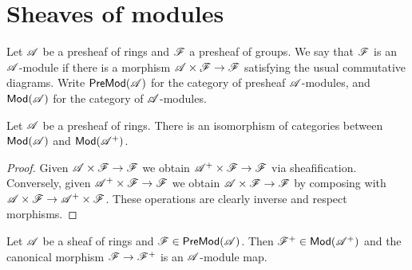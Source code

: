\documentclass{memoir}
\begin{document}
\section{Sheaves of modules}
\begin{definition}
    Let $\mathscr{A}$ be a presheaf of rings and $\mathscr{F}$ a presheaf of groups.
    We say that $\mathscr{F}$ is an $\mathscr{A}$-module if there is a morphism $\mathscr{A}\times \mathscr{F}\to \mathscr{F}$ satisfying the usual commutative diagrams.
    Write ${\normalfont\mathsf{PreMod}}(\mathscr{A})$ for the category of presheaf $\mathscr{A}$-modules, and ${\normalfont\mathsf{Mod}}(\mathscr{A})$ for the category of $\mathscr{A}$-modules.
\end{definition}
\begin{proposition}
    Let $\mathscr{A}$ be a presheaf of rings.
    There is an isomorphism of categories between ${\normalfont\mathsf{Mod}}(\mathscr{A})$ and ${\normalfont\mathsf{Mod}}(\mathscr{A}^+)$.
\end{proposition}
\begin{proof}
    Given $\mathscr{A}\times \mathscr{F}\to \mathscr{F}$ we obtain $\mathscr{A}^+\times \mathscr{F}\to \mathscr{F}$ via sheafification.
    Conversely, given $\mathscr{A}^+\times \mathscr{F}\to \mathscr{F}$ we obtain $\mathscr{A}\times \mathscr{F}\to \mathscr{F}$ by composing with $\mathscr{A}\times \mathscr{F}\to \mathscr{A}^+\times \mathscr{F}$.
    These operations are clearly inverse and respect morphisms.
\end{proof}
\begin{proposition}
    Let $\mathscr{A}$ be a sheaf of rings and $\mathscr{F}\in {\normalfont\mathsf{PreMod}}(\mathscr{A})$.
    Then $\mathscr{F}^+\in {\normalfont\mathsf{Mod}}(\mathscr{A}^+)$ and the canonical morphism $\mathscr{F}\to \mathscr{F}^+$ is an $\mathscr{A}$-module map.
\end{proposition}
\end{document}
